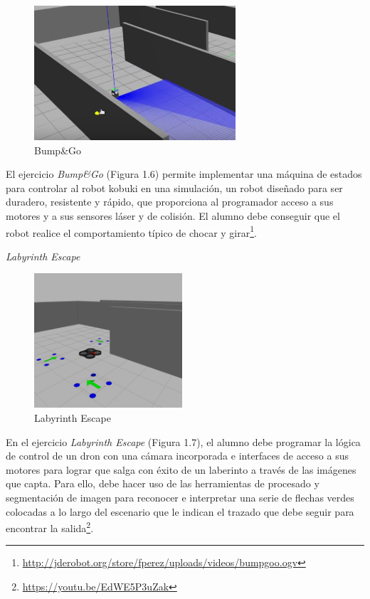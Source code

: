 \begin{figure}[H]
  \begin{center}
    \includegraphics[width=0.50\linewidth, height=5cm]{figures/bumpngo.png}
		\caption{Bump{\&}Go}
		\label{fig.bumpgo}
		\end{center}
\end{figure}

El ejercicio \textit{Bump\&Go} (Figura 1.6) permite implementar una máquina de estados para controlar al robot kobuki en una simulación, un robot diseñado para ser duradero, resistente y rápido, que proporciona al programador acceso a sus motores y a sus sensores láser y de colisión. El alumno debe conseguir que el robot realice el comportamiento típico de chocar y girar\footnote{\url{http://jderobot.org/store/fperez/uploads/videos/bumpgoo.ogv}}.

\hspace{0.36\linewidth}
\textit{Labyrinth Escape}

\begin{figure}[H]
  \begin{center}
    \includegraphics[width=0.50\linewidth, height=5cm]{figures/labyrinth_escape.png}
		\caption{Labyrinth Escape}
		\label{fig.laby}
		\end{center}
\end{figure}

En el ejercicio \textit{Labyrinth Escape} (Figura 1.7), el alumno debe programar la lógica de control de un dron con una cámara incorporada e interfaces de acceso a sus motores para lograr que salga con éxito de un laberinto a través de las imágenes que capta. Para ello, debe hacer uso de las herramientas de procesado y segmentación de imagen para reconocer e interpretar una serie de flechas verdes colocadas a lo largo del escenario que le indican el trazado que debe seguir para encontrar la salida\footnote{\url{https://youtu.be/EdWE5P3uZak}}.

